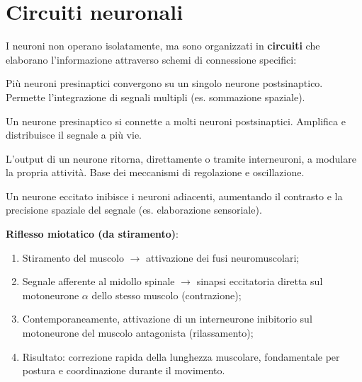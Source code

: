 \documentclass[11pt,a4paper,italian,twoside]{report}
\theoremstyle{definition} %
\begin{document}
\section{Circuiti neuronali}
\label{sec:circuiti_neuronali}

I neuroni non operano isolatamente, ma sono organizzati in \textbf{circuiti} che elaborano l'informazione attraverso schemi di connessione specifici:

\begin{description}[leftmargin=1.5em,style=nextline]
  \item[Circuito a convergenza] Più neuroni presinaptici convergono su un singolo neurone postsinaptico. Permette l'integrazione di segnali multipli (es. sommazione spaziale).
  \item[Circuito a divergenza] Un neurone presinaptico si connette a molti neuroni postsinaptici. Amplifica e distribuisce il segnale a più vie.
  \item[Circuito a feedback (ricorrente)] L'output di un neurone ritorna, direttamente o tramite interneuroni, a modulare la propria attività. Base dei meccanismi di regolazione e oscillazione.
  \item[Circuito a inibizione laterale] Un neurone eccitato inibisce i neuroni adiacenti, aumentando il contrasto e la precisione spaziale del segnale (es. elaborazione sensoriale).
\end{description}

\begin{esempio}
\textbf{Riflesso miotatico (da stiramento)}:
\begin{enumerate}
  \item Stiramento del muscolo $\rightarrow$ attivazione dei fusi neuromuscolari;
  \item Segnale afferente al midollo spinale $\rightarrow$ sinapsi eccitatoria diretta sul motoneurone $\alpha$ dello stesso muscolo (contrazione);
  \item Contemporaneamente, attivazione di un interneurone inibitorio sul motoneurone del muscolo antagonista (rilassamento);
  \item Risultato: correzione rapida della lunghezza muscolare, fondamentale per postura e coordinazione durante il movimento.
\end{enumerate}
\end{esempio}
\end{document}
